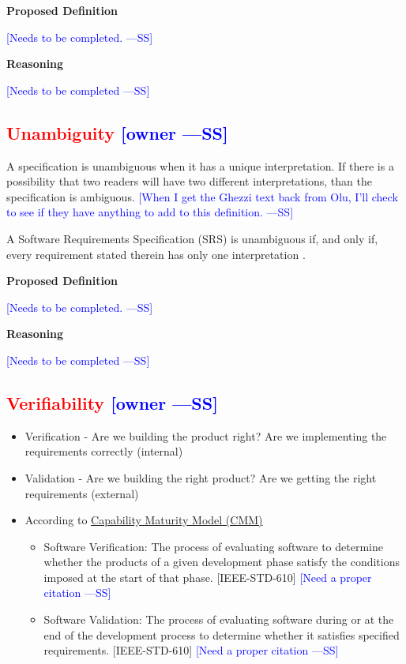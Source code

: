 \documentclass[letterpaper,cleveref]{lipics-v2019}
\newcommand{\authornote}[3]{\textcolor{#1}{[#3 ---#2]}}
\newcommand{\authornote}[3]{}
\newcommand{\wss}[1]{\authornote{blue}{SS}{#1}} %
\newcommand{\notdone}[1]{\textcolor{red}{#1}}
\theoremstyle{definition}
\begin{document}
\noindent \textbf{Proposed Definition} 

\wss{Needs to be completed.}

\noindent \textbf{Reasoning}

\wss{Needs to be completed}

\subsection{\notdone{Unambiguity} \wss{owner}}

A specification is unambiguous when it has a unique interpretation.  If there is
a possibility that two readers will have two different interpretations, than the
specification is ambiguous.  \wss{When I get the Ghezzi text back from Olu, I'll
  check to see if they have anything to add to this definition.}

A Software Requirements Specification (SRS) is unambiguous if, and only if,
every requirement stated therein has only one interpretation \citep{IEEE1998}.

\noindent \textbf{Proposed Definition} 

\wss{Needs to be completed.}

\noindent \textbf{Reasoning}

\wss{Needs to be completed}

\subsection{\notdone{Verifiability} \wss{owner}}

\begin{itemize}

\item Verification - Are we building the product right?  Are we implementing the
  requirements correctly (internal)
\item Validation - Are we building the right product? Are we getting the right
  requirements (external)
\item According to
  \href{https://en.wikipedia.org/wiki/Software_verification_and_validation}{Capability
    Maturity Model (CMM)}
\begin{itemize}
\item 
    Software Verification: The process of evaluating software to determine
    whether the products of a given development phase satisfy the conditions
    imposed at the start of that phase. [IEEE-STD-610] \wss{Need a proper citation}
  \item Software Validation: The process of evaluating software during or at the
    end of the development process to determine whether it satisfies specified
    requirements. [IEEE-STD-610] \wss{Need a proper citation}
\end{itemize}
\end{itemize}
\end{document}
